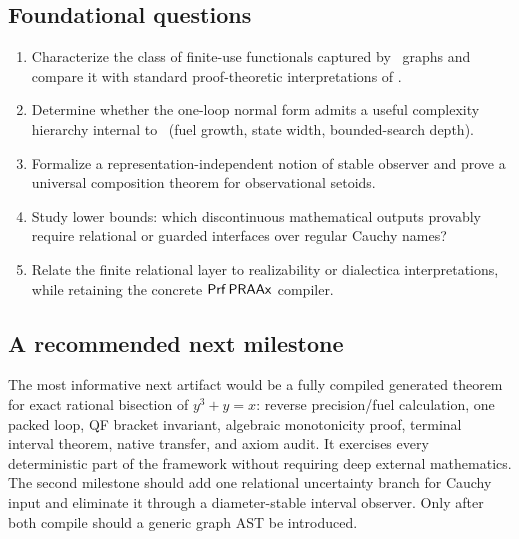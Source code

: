 \subsection{Foundational questions}

\begin{enumerate}[label=\textbf{R\arabic*.},resume]
  \item Characterize the class of finite-use functionals captured by \KIFC\ graphs and compare it with standard proof-theoretic interpretations of \iPRA.
  \item Determine whether the one-loop normal form admits a useful complexity hierarchy internal to \iPRA\ (fuel growth, state width, bounded-search depth).
  \item Formalize a representation-independent notion of stable observer and prove a universal composition theorem for observational setoids.
  \item Study lower bounds: which discontinuous mathematical outputs provably require relational or guarded interfaces over regular Cauchy names?
  \item Relate the finite relational layer to realizability or dialectica interpretations, while retaining the concrete \(\mathsf{Prf}\,\mathsf{PRAAx}\) compiler.
\end{enumerate}

\subsection{A recommended next milestone}

The most informative next artifact would be a fully compiled generated theorem for exact rational bisection of \(y^3+y=x\): reverse precision/fuel calculation, one packed loop, QF bracket invariant, algebraic monotonicity proof, terminal interval theorem, native transfer, and axiom audit.  It exercises every deterministic part of the framework without requiring deep external mathematics.  The second milestone should add one relational uncertainty branch for Cauchy input and eliminate it through a diameter-stable interval observer.  Only after both compile should a generic graph AST be introduced.
